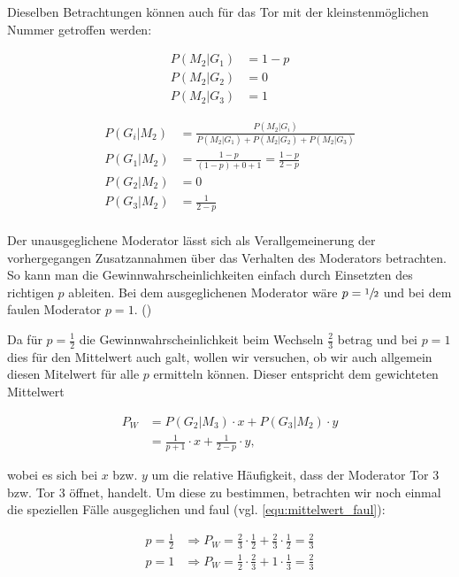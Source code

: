 Dieselben Betrachtungen können auch für das Tor mit der kleinstenmöglichen Nummer getroffen werden:

\begin{align*}
    P(M_2 | G_1) & = 1 - p \\
    P(M_2 | G_2) & = 0     \\
    P(M_2 | G_3) & = 1
\end{align*}

\begin{align*}
    P(G_i | M_2) & = \frac{P(M_2 | G_i)}{P(M_2 | G_1) + P(M_2 | G_2) + P(M_2 | G_3)} \\
    P(G_1 | M_2) & = \frac{1-p}{(1-p)+0+1} = \frac{1-p}{2-p}                         \\
    P(G_2 | M_2) & = 0                                                               \\
    P(G_3 | M_2) & = \frac{1}{2-p}                                                   \\
\end{align*}

Der unausgeglichene Moderator lässt sich als Verallgemeinerung der vorhergegangen Zusatzannahmen über das Verhalten des Moderators betrachten. So kann man die Gewinnwahrscheinlichkeiten einfach durch Einsetzten des richtigen $p$ ableiten.
Bei dem ausgeglichenen Moderator wäre $p = \sfrac{1}{2}$ und bei dem faulen Moderator $p = 1$.  (\cite{Rosenthal:2008})

Da für $p = \frac{1}{2}$ die Gewinnwahrscheinlichkeit beim Wechseln $\frac{2}{3}$ betrag und bei $p = 1$ dies für den Mittelwert auch galt, wollen wir versuchen, ob wir auch allgemein diesen Mitelwert für alle $p$ ermitteln können. Dieser entspricht dem gewichteten Mittelwert

\label{equ:mittelwert}
\begin{equation}
    \begin{split}
        P_W & = P(G_2 | M_3) \cdot x + P(G_3 | M_2) \cdot y    \\
        & = \frac{1}{p+1} \cdot x + \frac{1}{2-p} \cdot y,
    \end{split}
\end{equation}

wobei es sich bei $x$ bzw. $y$ um die relative Häufigkeit, dass der Moderator Tor 3 bzw. Tor 3 öffnet, handelt. Um diese zu bestimmen, betrachten wir noch einmal die speziellen Fälle ausgeglichen und faul (vgl. \autoref{equ:mittelwert_faul}):

\begin{align*}
    p = \frac{1}{2} & \Rightarrow  P_W = \frac{2}{3} \cdot \frac{1}{2} + \frac{2}{3} \cdot \frac{1}{2} = \frac{2}{3} \\
    p = 1           & \Rightarrow P_W = \frac{1}{2} \cdot \frac{2}{3} + 1\cdot \frac{1}{3} = \frac{2}{3}
\end{align*}

